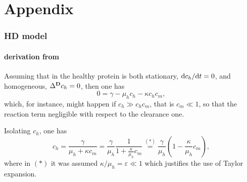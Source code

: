     \appendix
    \renewcommand\theequation{\thesection\arabic{equation}}
    \setcounter{equation}{0}


    \part*{Appendix}

        \section{HD model}\label{apxHDModel}

            \subsection{\texorpdfstring{\FKcontinuous{}}{[FK]\_c} derivation from \texorpdfstring{\HDcontinuous{}}{[HD]\_c}}\label{apxFKFromHD}

                Assuming that in \HDcontinuous{} the healthy protein is both stationary, $\mathrm{d}c_h/\mathrm{d}t=0$, and homogeneous, $\Delta^{\mathbf D} c_h=0$, then one has
                \begin{equation}
                    0=\gamma-\mu_hc_h-\kappa c_hc_m,
                    \label{eqNullReactionch}
                \end{equation}
                which, for instance, might happen if $c_h\gg c_hc_m$, that is $c_m\ll1$, so that the reaction term negligible with respect to the clearance one.

                Isolating $c_h$, one has 
                \begin{equation*} 
                    c_h=
                    \frac\gamma{\mu_h+\kappa c_m}=
                    \frac\gamma{\mu_h}\frac1{1+\frac\kappa{\mu_h}c_m}
                    \overset{(*)}{=}
                    \frac\gamma{\mu_h}\left(1-\frac\kappa{\mu_h}c_m\right),
                    \label{eqchTaylorExpanded}
                \end{equation*}
                where in $(*)$ it was assumed $\kappa/\mu_h=\varepsilon\ll1$ which justifies the use of Taylor expansion. \cite{AnalisiICanutoTabacco2014}

